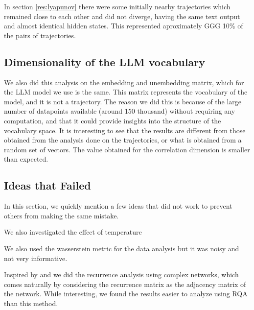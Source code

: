 \documentclass[a4paper,12pt]{article}
\begin{document}
In section \ref{res:lyapunov} there were some initially nearby trajectories which remained close to each other and did not diverge, having the same text output and almost identical hidden states. This represented aproximately GGG 10\% of the pairs of trajectories.

\subsection{Dimensionality of the LLM vocabulary}


We also did this analysis on the embedding and unembedding matrix, which for the LLM model we use is the same. This matrix represents the vocabulary of the model, and it is not a trajectory. 
The reason we did this is because of the large number of datapoints available (around 150 thousand) without requiring any computation, and that it could provide insights into the structure of the vocabulary space. It is interesting to see that the results are different from those obtained from the analysis done on the trajectories, or what is obtained from a random set of vectors. The value obtained for the correlation dimension is smaller than expected.



\subsection{Ideas that Failed} %
In this section, we quickly mention a few ideas that did not work to prevent others from making the same mistake.

We also investigated the effect of temperature

We also used the wasserstein metric for the data analysis but it was noisy and not very informative.


Inspired by \cite{DONNER_2011} and \cite{Donner_2010} \cite{ZOU20191} we did the recurrence analysis using complex networks, which comes naturally by considering the recurrence matrix as the adjacency matrix of the network. While interesting, we found the results easier to analyze using RQA than this method. %
\end{document}
